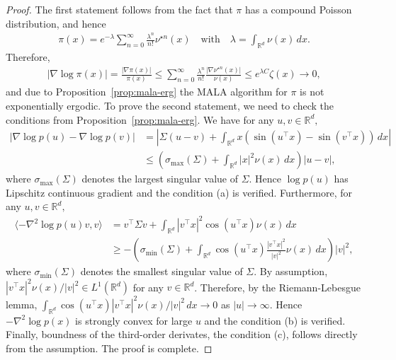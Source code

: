 \documentclass[preprint, 3p, authoryear]{elsarticle}
\newcommand{\R}{\mathbb R}
\theoremstyle{definition}
\begin{document}
\begin{proof}
The first statement follows from the fact that $\pi$ has a compound Poisson distribution, and hence
\begin{eqnarray*}
	\pi(x)=e^{-\lambda}\sum_{n=0}^{\infty}\frac{\lambda^{n}}{n!}\nu^{\star n}(x)
	\quad\text{with}\quad\lambda=\int_{\R^d} \nu (x)\, dx.
\end{eqnarray*}
Therefore, 
\begin{eqnarray*}
|\nabla \log \pi (x)| = \frac{\left|\nabla\pi(x)\right|}{\pi(x)}\leq\sum_{n=0}^{\infty}\frac{\lambda^{n}}{n!}\frac{\left|\nabla\nu^{\star n}(x)\right|}{\nu(x)}\leq e^{\lambda C} \zeta(x) \to 0,
\end{eqnarray*}
and due to Proposition~\ref{prop:mala-erg} the MALA  algorithm for $\pi$ is not exponentially ergodic.
To prove the second statement, we need to check the conditions from Proposition~\ref{prop:mala-erg}.
We have for any \(u,v\in \mathbb{R}^d,\) 
\begin{align*}
	| \nabla\log p(u) - \nabla\log p(v) |  &=   \left| \Sigma (u-v)  + \int_{\R^d} x  (\sin (u^{\top}x) - \sin(v^{\top}x))\, dx\right| \\
		&\leq \left(\sigma_{\max}(\Sigma) + \int_{\R^d} |x|^2 \nu(x) \,dx \right) |u-v|,
\end{align*}
where $\sigma_{\max}(\Sigma)$ denotes the largest singular value of $\Sigma$. Hence $\log p(u)$ has Lipschitz continuous gradient and 
the condition (a) is verified. Furthermore, 
for any \(u,v\in \mathbb{R}^d,\) 
\begin{align*}
	\langle-\nabla^2 \log p(u) v , v \rangle
	&=v^\top\Sigma v +\int_{\mathbb{R}^{d}}\left|v^{\top}x\right|^{2}\cos(u^{\top}x) \nu(x)\,dx\\
	&\geq -\left(\sigma_{\min}(\Sigma)+\int_{\mathbb{R}^{d}}\cos(u^{\top}x) \frac{\left|v^{\top}x\right|^{2}}{|v|^2} \nu(x)\, dx\right)|v|^2,
\end{align*}
where $\sigma_{\min}(\Sigma)$ denotes the smallest singular value of $\Sigma$.
By assumption, $|v^{\top}x|^{2}\nu(x)/|v|^2  \in L^1(\R^d)$ for any $v\in\R^d$. Therefore, by the Riemann-Lebesgue lemma,
$\int_{\mathbb{R}^{d}}\cos(u^{\top}x) |v^{\top}x|^{2} \nu(x) / |v|^2 \, dx \to 0$ as $|u|\to\infty$. Hence 
$-\nabla^2 \log p(x)$ is strongly convex for large $u$ and the condition (b) is verified. Finally, boundness of the third-order derivates, the condition (c), 
follows directly from the assumption. The proof is complete.
\end{proof}
\end{document}
